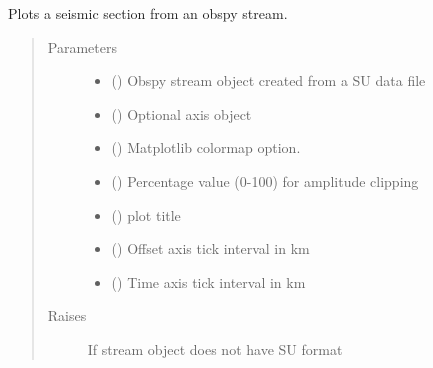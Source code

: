 \documentclass[letterpaper,10pt,english]{sphinxmanual}
\begin{document}
\begin{fulllineitems}
\label{\detokenize{ref/seisflows.tools:seisflows.tools.graphics.plot_section}}
Plots a seismic section from an obspy stream.
\begin{quote}\begin{description}
\item[{Parameters}] \leavevmode\begin{itemize}
\item {} 
 () \textendash{} Obspy stream object created from a SU data file

\item {} 
 () \textendash{} Optional axis object

\item {} 
 () \textendash{} Matplotlib colormap option.

\item {} 
 () \textendash{} Percentage value (0-100) for amplitude clipping

\item {} 
 () \textendash{} plot title

\item {} 
 () \textendash{} Offset axis tick interval in km

\item {} 
 () \textendash{} Time axis tick interval in km

\end{itemize}

\item[{Raises}] \leavevmode
{} \textendash{} If stream object does not have SU format

\end{description}\end{quote}

\end{fulllineitems}
\end{document}
